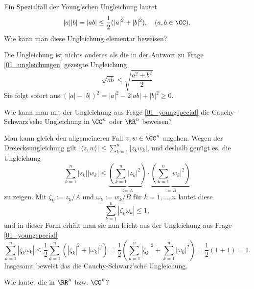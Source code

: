 \begin{frage}
  \label{01_youngspecial}
  Ein Spezialfall der Young'schen Ungleichung lautet
  \[
  |a| |b| = |ab| \le \frac{1}{2} (|a|^2+|b|^2), \quad (a,b \in\CC).
  \]
  Wie kann man diese Ungleichung elementar beweisen?
\end{frage}

\begin{antwort}
  Die Ungleichung ist nichts anderes als die in der Antwort zu Frage \ref{01_ungleichungen} 
  gezeigte Ungleichung 
  \[
  \sqrt{ab} \le \sqrt{\frac{a^2+b^2}{2}} 
  \]
  Sie folgt sofort aus 
  $(|a|-|b|)^2 = |a|^2-2|ab|+|b|^2 \ge0$.
  \AntEnd
  
\end{antwort}






\begin{frage}
  Wie kann man mit der Ungleichung aus Frage \ref{01_youngspecial} 
  die Cauchy-Schwarz'sche 
  Ungleichung in $\CC^n$ oder $\RR^n$ beweisen?
\end{frage}

\begin{antwort}
  Man kann gleich den allgemeineren Fall $z,w \in \CC^n$ angehen.      
  Wegen der Dreiecksungleichung 
  gilt $|\langle z,w \rangle | \le \sum_{k=1}^n |z_k w_k|$, und deshalb 
  genügt es, die Ungleichung 
  \[
  \sum_{k=1}^n |z_k| |w_k| \le  
  \underbrace{ \left(\sum_{k=1}^n |z_k|^2 \right)}_{ := A } \cdot 
  \underbrace{ \left(\sum_{k=1}^n |w_k|^2 \right)}_{ := B }
  \]
  zu zeigen. 
  Mit $\zeta_k := z_k /A$ und $\omega_k := w_k/B$ für $k=1,\ldots,n$ lautet 
  diese
  \[
  \sum_{k=1}^n  |\zeta_k \omega_k | \le 1,
  \]
  und in dieser Form erhält man sie nun leicht aus der Ungleichung 
  aus Frage \ref{01_youngspecial}
  \[
  \sum_{k=1}^n  |\zeta_k \omega_k | \le 
  \frac{1}{2}\sum_{k=1}^n (|\zeta_k|^2 + |\omega_k|^2) = 
  \frac{1}{2}\left( \sum_{k=1}^n |\zeta_k|^2 + \sum_{k=1}^n |\omega_k|^2 \right)
  = \frac{1}{2}(1+1)=1.
  \]
  Insgesamt beweist das die Cauchy-Schwarz'sche Ungleichung.
  \AntEnd
\end{antwort}






\begin{frage}
  \label{minkowski}
  Wie lautet die  in $\RR^n$ bzw. $\CC^n$?
\end{frage}

